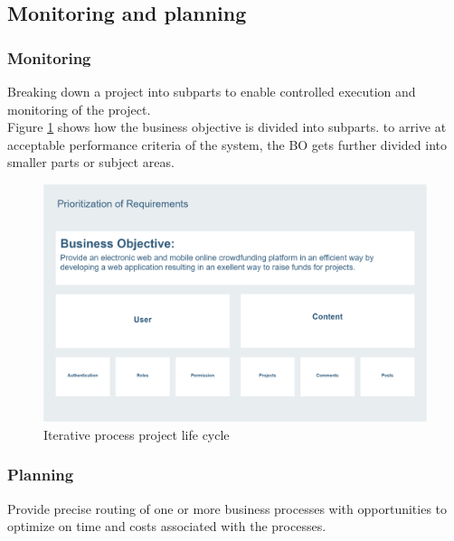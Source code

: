 \subsection{Monitoring and planning}
\subsubsection*{Monitoring}
Breaking down a project into subparts to enable controlled execution and monitoring of the project.\\
Figure \ref{fig:bos} shows how the business objective is divided into subparts. to arrive at acceptable performance criteria of the system, the BO gets further divided into smaller parts or subject areas.
\begin{figure}[!ht]
      \center
      \includegraphics[scale=0.20]{assets/bos.png}
      \caption{Iterative process project life cycle}
      \label{fig:bos}
\end{figure}
\subsubsection*{Planning}
Provide precise routing of one or more business processes with opportunities to optimize on time and costs associated with the processes.

